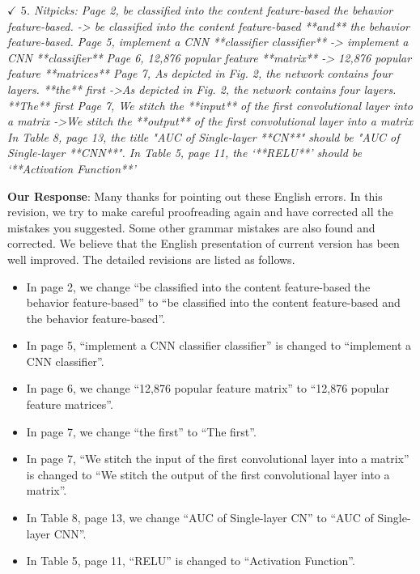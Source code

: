 \documentclass{amsart}
\theoremstyle{definition}
\theoremstyle{remark}
\numberwithin{equation}{section}
\begin{document}
\emph{$\checkmark$ $5$. Nitpicks:
Page 2, be classified into the content feature-based the behavior feature-based. -> be classified into the content feature-based **and** the behavior feature-based.
Page 5, implement a CNN **classifier classifier** -> implement a CNN **classifier**
Page 6, 12,876 popular feature **matrix** -> 12,876 popular feature **matrices**
Page 7, As depicted in Fig. 2, the network contains four layers. **the** first ->As depicted in Fig. 2, the network contains four layers. **The** first
Page 7, We stitch the **input** of the first convolutional layer into a matrix ->We stitch the **output** of the first convolutional layer into a matrix
In Table 8, page 13, the title "AUC of Single-layer **CN**" should be "AUC of Single-layer **CNN**".
In Table 5, page 11, the ‘**RELU**’ should be ‘**Activation Function**’}

\textbf{Our Response}:
Many thanks for pointing out these English errors. In this
revision, we try to make careful proofreading again and have corrected all the mistakes
you suggested. Some other grammar mistakes are also found and corrected.
We believe that the English presentation of current version has been well improved.
The detailed revisions are listed as follows.

\begin{itemize}
	\item In page 2, we change ``be classified into the content feature-based the behavior feature-based'' to ``be classified into the content feature-based and the behavior feature-based''.
	\item In page 5,  ``implement a CNN classifier classifier'' is changed to ``implement a CNN classifier''.
	\item In page 6, we change ``12,876 popular feature matrix'' to ``12,876 popular feature matrices''.
	\item In page 7, we change ``the first'' to ``The first''.
	\item In page 7, ``We stitch the input of the first convolutional layer into a matrix'' is changed to ``We stitch the output of the first convolutional layer into a matrix''.
	\item In Table 8, page 13, we change ``AUC of Single-layer CN'' to ``AUC of Single-layer CNN''.
	\item In Table 5, page 11, ``RELU'' is changed to ``Activation Function''.
	
\end{itemize}
\end{document}
